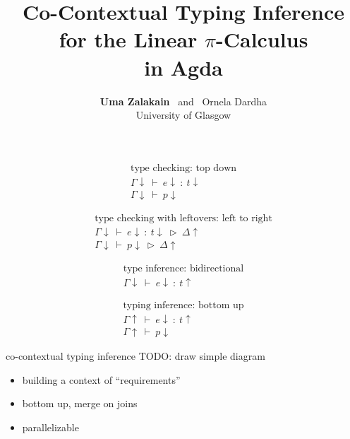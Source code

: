 \documentclass[dvipsnames]{beamer}
\title{Co-Contextual Typing Inference \\ for the Linear \(\pi\)-Calculus \\ in Agda}
\author{\textbf{Uma Zalakain} \ and \  Ornela Dardha \\ University of Glasgow}
\date{}
\newcommand{\sitem}{\item[\raisebox{.45ex}{\rule{.6ex}{.6ex}}]}
\theoremstyle{definition}\newtheorem{mytheorem}{Theorem}[section]
\newcommand{\typeExpr}[3]{#1 ~ \vdash{} ~ #2 ~ : ~ #3}
\newcommand{\typeProc}[2]{#1 ~ \vdash{} ~ #2}
\begin{document}
\maketitle

\begin{frame}
\[
\begin{gathered}
\text{type checking: top down} \\
\typeExpr{\Gamma \downarrow}{e \downarrow}{t \downarrow} \\
\typeProc{\Gamma \downarrow}{p \downarrow}
\end{gathered}
\]
\end{frame}

\begin{frame}
\[
\begin{gathered}
\text{type checking with leftovers: left to right} \\
\typeExpr{\Gamma \downarrow}{e \downarrow}{t \downarrow} ~ \triangleright{} ~ \Delta \uparrow \\
\typeProc{\Gamma \downarrow}{p \downarrow} ~ \triangleright{} ~ \Delta \uparrow 
\end{gathered}
\]
\end{frame}

\begin{frame}
\[
\begin{gathered}
\text{type inference: bidirectional} \\
\typeExpr{\Gamma \downarrow}{e \downarrow}{t \uparrow}
\end{gathered}
\]
\end{frame}

\begin{frame}
\[
\begin{gathered}
\text{typing inference: bottom up} \\
\typeExpr{\Gamma \uparrow}{e \downarrow}{t \uparrow}\\
\typeProc{\Gamma \uparrow}{p \downarrow}
\end{gathered}
\]
\end{frame}

\begin{frame}{co-contextual typing inference}
TODO: draw simple diagram
\begin{itemize}
\setlength\itemsep{1em}
\sitem building a context of ``requirements''
\sitem bottom up, merge on joins
\sitem parallelizable
\end{itemize}
\end{frame}
\end{document}
